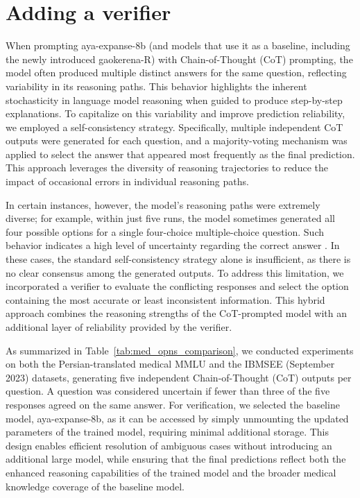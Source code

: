 \documentclass[conference]{IEEEtran}
\begin{document}
         \section{Adding a verifier}
When prompting aya-expanse-8b (and models that use it as a baseline, including the newly introduced gaokerena-R) with Chain-of-Thought (CoT) prompting, the model often produced multiple distinct answers for the same question, reflecting variability in its reasoning paths. This behavior highlights the inherent stochasticity in language model reasoning when guided to produce step-by-step explanations. To capitalize on this variability and improve prediction reliability, we employed a self-consistency strategy. Specifically, multiple independent CoT outputs were generated for each question, and a majority-voting mechanism was applied to select the answer that appeared most frequently as the final prediction. This approach leverages the diversity of reasoning trajectories to reduce the impact of occasional errors in individual reasoning paths.

In certain instances, however, the model's reasoning paths were extremely diverse; for example, within just five runs, the model sometimes generated all four possible options for a single four-choice multiple-choice question. Such behavior indicates a high level of uncertainty regarding the correct answer \cite{b25}. In these cases, the standard self-consistency strategy alone is insufficient, as there is no clear consensus among the generated outputs. To address this limitation, we incorporated a verifier to evaluate the conflicting responses and select the option containing the most accurate or least inconsistent information. This hybrid approach combines the reasoning strengths of the CoT-prompted model with an additional layer of reliability provided by the verifier.

As summarized in Table~\ref{tab:med_opns_comparison}, we conducted experiments on both the Persian-translated medical MMLU and the IBMSEE (September 2023) datasets, generating five independent Chain-of-Thought (CoT) outputs per question. A question was considered uncertain if fewer than three of the five responses agreed on the same answer. For verification, we selected the baseline model, aya-expanse-8b, as it can be accessed by simply unmounting the updated parameters of the trained model, requiring minimal additional storage. This design enables efficient resolution of ambiguous cases without introducing an additional large model, while ensuring that the final predictions reflect both the enhanced reasoning capabilities of the trained model and the broader medical knowledge coverage of the baseline model.
\end{document}
